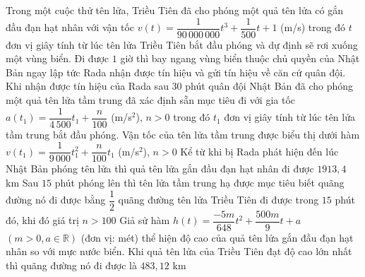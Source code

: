 \cauds
\begin{ex}%
	Trong một cuộc thử tên lửa, Triều Tiên đã cho phóng một quả tên lửa có gắn đầu đạn hạt nhân với vận tốc $v(t) = \dfrac{1}{90\,000\,000}t^3 + \dfrac{1}{500}t + 1$ (m/s) trong đó $t$ đơn vị giây tính từ lúc tên lửa Triều Tiên bắt đầu phóng và dự định sẽ rơi xuống một vùng biển. Đi được $1$ giờ thì bay ngang vùng biển thuộc chủ quyền của Nhật Bản ngay lập tức Rada nhận được tín hiệu và gửi tín hiệu về căn cứ quân đội. Khi nhận được tín hiệu của Rada sau $30$ phút quân đội Nhật Bản đã cho phóng một quả tên lửa tầm trung đã xác định sẵn mục tiêu đi với gia tốc $a(t_1) = \dfrac{1}{4\,500}t_1 + \dfrac{n}{100}$ (m/s$^2$), $n > 0$ trong đó $t_1$ đơn vị giây tính từ lúc tên lửa tầm trung bắt đầu phóng.
	\choiceTF
	{Vận tốc của tên lửa tầm trung được biểu thị dưới hàm $v(t_1) = \dfrac{1}{9\,000}t_1^2 + \dfrac{n}{100}t_1$ (m/s$^2$), $n > 0$}
	{\True Kể từ khi bị Rada phát hiện đến lúc Nhật Bản phóng tên lửa thì quả tên lửa gắn đầu đạn hạt nhân đi được $1913{,}4$ km}
	{\True Sau $15$ phút phóng lên thì tên lửa tầm trung hạ được mục tiêu biết quãng đường nó đi được bằng $\dfrac{1}{2}$ quãng đường tên lửa Triều Tiên đi được trong $15$ phút đó, khi đó giá trị $n > 100$}
	{\True Giả sử hàm $h(t) = \dfrac{-5m}{648}t^2 + \dfrac{500m}{9}t + a$ $(m > 0, a \in \mathbb{R})$ (đơn vị: mét) thể hiện độ cao của quả tên lửa gắn đầu đạn hạt nhân so với mực nước biển. Khi quả tên lửa của Triều Tiên đạt độ cao lớn nhất thì quãng đường nó đi được là $483{,}12$ km}
\end{ex}
